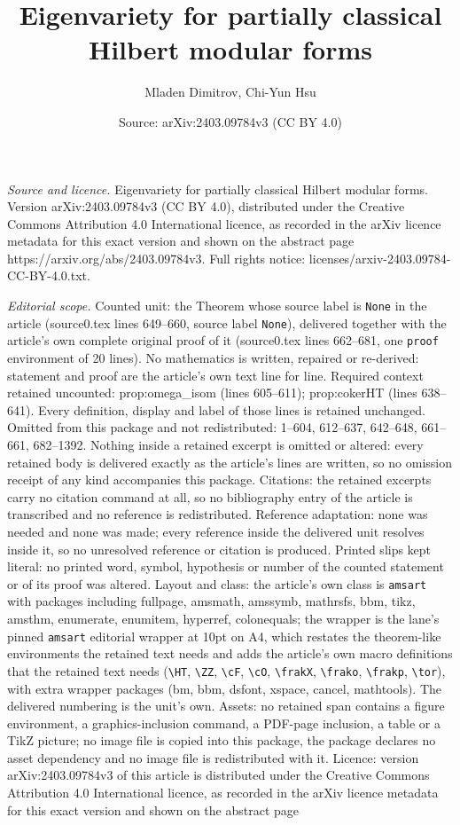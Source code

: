 \documentclass[10pt,a4paper]{amsart}
\title[Eigenvariety for partially classical Hilbert modular forms]{Eigenvariety for partially classical Hilbert modular forms}
\author{Mladen Dimitrov, Chi-Yun Hsu}
\date{Source: arXiv:2403.09784v3 (CC BY 4.0)}
\begin{document}
\maketitle

\noindent\emph{Source and licence.} Eigenvariety for partially classical Hilbert modular forms. Version arXiv:2403.09784v3 (CC BY 4.0), distributed under the Creative Commons Attribution 4.0 International licence, as recorded in the arXiv licence metadata for this exact version and shown on the abstract page https://arxiv.org/abs/2403.09784v3. Full rights notice: licenses/arxiv-2403.09784-CC-BY-4.0.txt.\par\smallskip

\noindent\textit{Editorial scope.} Counted unit: the Theorem whose source label is \texttt{None} in the article (source0.tex lines 649--660, source label \texttt{None}), delivered together with the article's own complete original proof of it (source0.tex lines 662--681, one \texttt{proof} environment of 20 lines). No mathematics is written, repaired or re-derived: statement and proof are the article's own text line for line. Required context retained uncounted: prop:omega\_isom (lines 605--611); prop:cokerHT (lines 638--641). Every definition, display and label of those lines is retained unchanged. Omitted from this package and not redistributed: 1--604, 612--637, 642--648, 661--661, 682--1392. Nothing inside a retained excerpt is omitted or altered: every retained body is delivered exactly as the article's lines are written, so no omission receipt of any kind accompanies this package. Citations: the retained excerpts carry no citation command at all, so no bibliography entry of the article is transcribed and no reference is redistributed. Reference adaptation: none was needed and none was made; every reference inside the delivered unit resolves inside it, so no unresolved reference or citation is produced. Printed slips kept literal: no printed word, symbol, hypothesis or number of the counted statement or of its proof was altered. Layout and class: the article's own class is \texttt{amsart} with packages including fullpage, amsmath, amssymb, mathrsfs, bbm, tikz, amsthm, enumerate, enumitem, hyperref, colonequals; the wrapper is the lane's pinned \texttt{amsart} editorial wrapper at 10pt on A4, which restates the theorem-like environments the retained text needs and adds the article's own macro definitions that the retained text needs (\texttt{\textbackslash HT}, \texttt{\textbackslash ZZ}, \texttt{\textbackslash cF}, \texttt{\textbackslash cO}, \texttt{\textbackslash frakX}, \texttt{\textbackslash frako}, \texttt{\textbackslash frakp}, \texttt{\textbackslash tor}), with extra wrapper packages (bm, bbm, dsfont, xspace, cancel, mathtools). The delivered numbering is the unit's own. Assets: no retained span contains a figure environment, a graphics-inclusion command, a PDF-page inclusion, a table or a TikZ picture; no image file is copied into this package, the package declares no asset dependency and no image file is redistributed with it. Licence: version arXiv:2403.09784v3 of this article is distributed under the Creative Commons Attribution 4.0 International licence, as recorded in the arXiv licence metadata for this exact version and shown on the abstract page 
\end{document}
